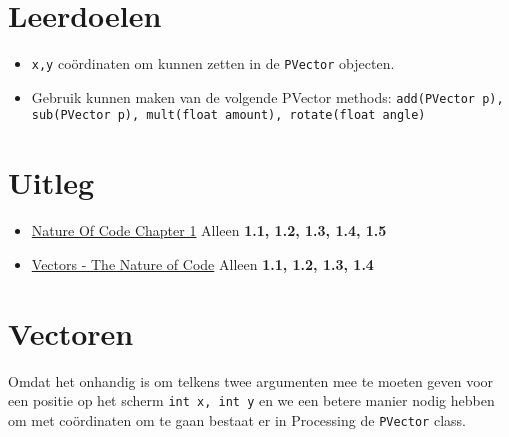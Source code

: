 \newcommand{\tttt}{Vectoren}
\newcommand{\dddd}{Datum 1}



\section{Leerdoelen}
\begin{itemize}
	\item \texttt{x,y} co\"ordinaten om kunnen zetten in de \texttt{PVector} objecten.
	\item Gebruik kunnen maken van de volgende PVector methods: \texttt{add(PVector p), sub(PVector p), mult(float amount), rotate(float angle)}
\end{itemize}

\section{Uitleg}
\begin{itemize}
\item\href{https://natureofcode.com/book/chapter-1-vectors/}{Nature Of Code Chapter 1} Alleen \textbf{1.1, 1.2, 1.3, 1.4, 1.5}
\item\href{https://www.youtube.com/watch?v=mWJkvxQXIa8&list=PLRqwX-V7Uu6ZwSmtE13iJBcoI-r4y7iEc}{Vectors - The Nature of Code} Alleen \textbf{1.1, 1.2, 1.3, 1.4}
\end{itemize}

\section{Vectoren}
Omdat het onhandig is om telkens twee argumenten mee te moeten geven voor een positie op het scherm \texttt{int x, int y} en we een betere manier nodig hebben om met co\"ordinaten om te gaan bestaat er in Processing de \texttt{PVector} class.

